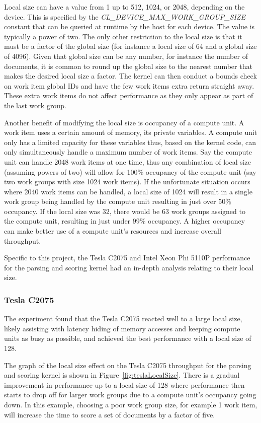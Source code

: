 Local size can have a value from 1 up to 512, 1024, or 2048, depending on the
device. This is specified by the \emph{CL\_DEVICE\_MAX\_WORK\_GROUP\_SIZE}
constant that can be queried at runtime by the host for each device. The value
is typically a power of two. The only other restriction to the local size is
that it must be a factor of the global size (for instance a local size of 64 and
a global size of 4096). Given that global size can be any number, for instance
the number of documents, it is common to round up the global size to the nearest
number that makes the desired local size a factor. The kernel can then conduct a
bounds check on work item global IDs and have the few work items extra return
straight away. These extra work items do not affect performance as they only
appear as part of the last work group.

Another benefit of modifying the local size is occupancy of a compute unit. A
work item uses a certain amount of memory, its private variables. A compute unit
only has a limited capacity for these variables thus, based on the kernel code,
can only simultaneously handle a maximum number of work items. Say the compute
unit can handle 2048 work items at one time, thus any combination of local size
(assuming powers of two) will allow for 100\% occupancy of the compute unit (say
two work groups with size 1024 work items). If the unfortunate situation occurs
where 2040 work items can be handled, a local size of 1024 will result in a
single work group being handled by the compute unit resulting in just over 50\%
occupancy. If the local size was 32, there would be 63 work groups assigned to
the compute unit, resulting in just under 99\% occupancy. A higher occupancy can
make better use of a compute unit's resources and increase overall throughput.

Specific to this project, the Tesla C2075 and Intel Xeon Phi 5110P performance
for the parsing and scoring kernel had an in-depth analysis relating to their
local size.

\subsubsection{Tesla C2075}

The experiment found that the Tesla C2075 reacted well to a large local size,
likely assisting with latency hiding of memory accesses and keeping compute
units as busy as possible, and achieved the best performance with a local size
of 128.

The graph of the local size effect on the Tesla C2075 throughput for the parsing
and scoring kernel is shown in Figure~\ref{fig:teslaLocalSize}. There is a
gradual improvement in performance up to a local size of 128 where performance
then starts to drop off for larger work groups due to a compute unit's occupancy
going down. In this example, choosing a poor work group size, for example 1 work
item, will increase the time to score a set of documents by a factor of five.

